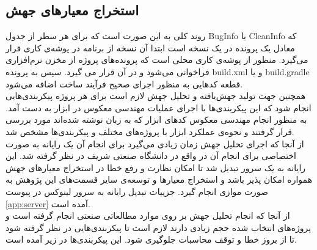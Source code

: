 \subsection{استخراج معیارهای جهش}
روند کلی به این صورت است که برای هر سطر از جدول BugInfo   یا CleanInfo که معادل یک  پرونده  در یک نسخه است ابتدا آن نسخه از برنامه در پوشه‌ی کاری قرار می‌گیرد. منظور از پوشه‌ی کاری محلی است  که پرونده‌های پروژه از مخزن نرم‌افزاری فراخوانی می‌شود و در آن قرار می گیرد. سپس به پرونده build.xml    و یا build.gradle  قطعه کدهایی  به منظور  اجرای  صحیح فرآیند ساخت اضافه می‌شود.  \\
همچنین جهت تولید جهش‌یافته و تحلیل جهش لازم است برای هر پروژه پیکربندی‌هایی انجام شود که این پیکربندی‌ها با اجرای عملیات مهندسی معکوس در ابزار  به دست آمد. به منظور انجام مهندسی معکوس کدهای ابزار که به زبان  نوشته شده‌اند مورد بررسی قرار گرفتند و نحوه‌ی عملکرد ابزار با پروژه‌های مختلف و پیکربندی‌ها مشخص شد. \\
از آنجا که اجرای تحلیل جهش زمان زیادی می‌گیرد برای انجام آن یک رایانه به صورت اختصاصی برای انجام آن در  واقع در دانشگاه صنعتی شریف در نظر گرفته شد. این رایانه به یک سرور  تبدیل شد تا امکان نظارت و رفع خطا در استخراج معیارهای جهش همواره امکان پذیر باشد و استخراج معیارها و توسعه‌ی سایر قسمت‌های این پژوهش به صورت موازی انجام گیرد. جزییات تبدیل رایانه به سرور لینوکس در پیوست \ref{app:server} آمده است. \\
از آنجا که انجام تحلیل جهش بر روی موارد مطالعاتی صنعتی انجام گرفته است و پروژه‌های انتخاب شده حجم زیادی دارند لازم است تا پیکربندی‌هایی در نظر گرفته شود تا از بروز خطا و توقف محاسبات جلوگیری شود. این پیکربندی‌ها در زیر آمده است.  
